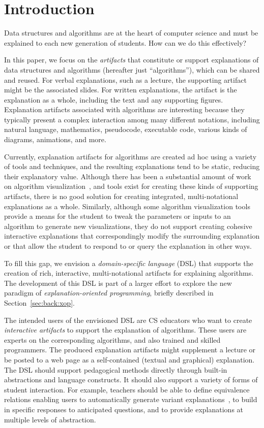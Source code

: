 \documentclass[conference]{IEEEtran}
\begin{document}
\section{Introduction}
\label{sec:intro}

Data structures and algorithms are at the heart of computer science and must be
explained to each new generation of students. How can we do this effectively?


In this paper, we focus on the \emph{artifacts} that constitute or support
explanations of data structures and algorithms (hereafter just ``algorithms''),
which can be shared and reused.
%
For verbal explanations, such as a lecture, the supporting artifact might be
the associated slides. For written explanations, the artifact is the
explanation as a whole, including the text and any supporting figures.
%
Explanation artifacts associated with algorithms are interesting because they
typically present a complex interaction among many different notations,
including natural language, mathematics, pseudocode, executable code, various
kinds of diagrams, animations, and more.


Currently, explanation artifacts for algorithms are created ad hoc using a
variety of tools and techniques, and the resulting explanations tend to be
static, reducing their explanatory value.
%
Although there has been a substantial amount of work on algorithm
visualization~\cite{Gloor92,Gloor97,HDS02, shaffer2010algorithm, HANSEN2002291,
KANN1997223}, and tools exist for creating these kinds of supporting artifacts,
there is no good solution for creating integrated, multi-notational
explanations as a whole. Similarly, although some algorithm visualization tools
provide a means for the student to tweak the parameters or inputs to an
algorithm to generate new visualizations, they do not support creating cohesive
interactive explanations that correspondingly modify the surrounding
explanation or that allow the student to respond to or query the explanation in
other ways.


To fill this gap, we envision a \emph{domain-specific language} (DSL) that
supports the creation of rich, interactive, multi-notational artifacts for
explaining algorithms.
%
The development of this DSL is part of a larger effort to explore the new
paradigm of \emph{explanation-oriented programming}, briefly described in
Section~\ref{sec:back:xop}.


The intended users of the envisioned DSL are CS educators who want to create
\emph{interactive artifacts} to support the explanation of algorithms. These
users are experts on the corresponding algorithms, and also trained and skilled
programmers. The produced explanation artifacts might supplement a lecture or
be posted to a web page as a self-contained (textual and graphical)
explanation.
%
The DSL should support pedagogical methods directly through built-in
abstractions and language constructs. It should also support a variety of forms
of student interaction. For example, teachers should be able to define
equivalence relations enabling users to automatically generate variant
explanations~\cite{EW13jvlc}, to build in specific responses to anticipated
questions, and to provide explanations at multiple levels of abstraction.
\end{document}
